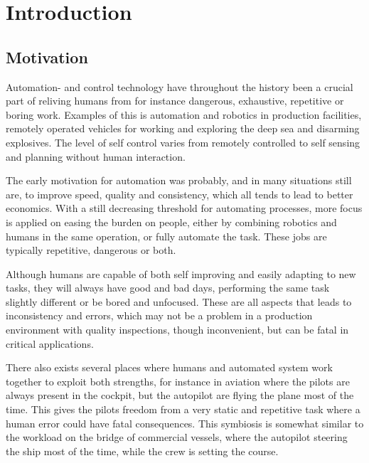 
\chapter{Introduction}\label{chapter:introduction}
\section{Motivation}\label{sec:motivation}
Automation- and control technology have throughout the history been a crucial part of reliving humans from for instance dangerous, exhaustive, repetitive or boring work. Examples of this is automation and robotics in production facilities, remotely operated vehicles for working and exploring the deep sea and disarming explosives. The level of self control varies from remotely controlled to self sensing and planning without human interaction.

The early motivation for automation was probably, and in many situations still are, to improve speed, quality and consistency, which all tends to lead to better economics. With a still decreasing threshold for automating processes, more focus is applied on easing the burden on people, either by combining robotics and humans in the same operation, or fully automate the task. These jobs are typically repetitive, dangerous or both.

Although humans are capable of both self improving and easily adapting to new tasks, they  will always have good and bad days, performing the same task slightly different or be bored and unfocused. These are all aspects that leads to inconsistency and errors, which may not be a problem in a production environment with quality inspections, though inconvenient, but can be fatal in critical applications. 

There also exists several places where humans and automated system work together to exploit both strengths, for instance in aviation where the pilots are always present in the cockpit, but the autopilot are flying the plane most of the time. This gives the pilots freedom from a very static and repetitive task where a human error could have fatal consequences. This symbiosis is somewhat similar to the workload on the bridge of commercial vessels, where the autopilot steering the ship most of the time, while the crew is setting the course. 

